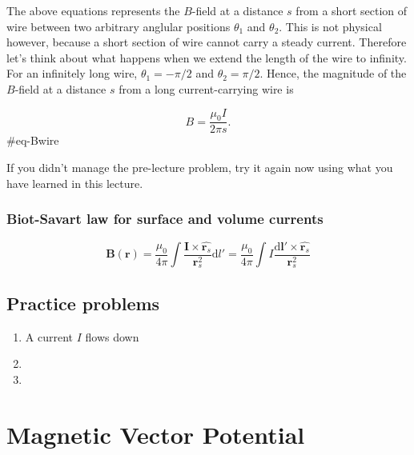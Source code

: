 \documentclass[
  letterpaper,
  DIV=11,
  numbers=noendperiod]{scrreprt}
\begin{document}
The above equations represents the \(B\)-field at a distance \(s\) from
a short section of wire between two arbitrary anglular positions
\(\theta_1\) and \(\theta_2\). This is not physical however, because a
short section of wire cannot carry a steady current. Therefore let's
think about what happens when we extend the length of the wire to
infinity. For an infinitely long wire, \(\theta_1 = -\pi/2\) and
\(\theta_2 = \pi/2\). Hence, the magnitude of the \(B\)-field at a
distance \(s\) from a long current-carrying wire is

\[ B = \frac{\mu_0 I}{2\pi s}. \]\#eq-Bwire

If you didn't manage the pre-lecture problem, try it again now using
what you have learned in this lecture.

\subsection{Biot-Savart law for surface and volume
currents}\label{biot-savart-law-for-surface-and-volume-currents}

\[\mathrm{\mathbf{B}}(\mathrm{\mathbf{r}}) = \frac{\mu_0}{4\pi} \int \frac{\mathrm{\mathbf{I}}\times \hat{\mathrm{\mathbf{r}}_s} }{\mathrm{\mathbf{r}}_s^2} \mathrm{d}l' =  \frac{\mu_0}{4\pi} \int I \frac{\mathrm{d} \mathrm{\mathbf{l}}' \times \hat{\mathrm{\mathbf{r}}_s} }{\mathrm{\mathbf{r}}_s^2} \]

\section{Practice problems}\label{practice-problems-4}

\begin{enumerate}
\def\labelenumi{\arabic{enumi})}
\item
  A current \(I\) flows down
\item
\item
\end{enumerate}


\chapter{Magnetic Vector Potential}\label{magnetic-vector-potential}

\newcommand{\l}{\mathrm{\mathbf{l}}}
\newcommand{\E}{\mathrm{\mathbf{E}}}
\newcommand{\F}{\mathrm{\mathbf{F}}}
\newcommand{\r}{\mathrm{\mathbf{r}}}
\newcommand{\B}{\mathrm{\mathbf{B}}}
\newcommand{\A}{\mathrm{\mathbf{A}}}
\newcommand{\x}{\mathrm{\mathbf{x}}}
\newcommand{\y}{\mathrm{\mathbf{y}}}
\newcommand{\z}{\mathrm{\mathbf{z}}}
\newcommand{\v}{\mathrm{\mathbf{v}}}
\newcommand{\p}{\mathrm{\mathbf{p}}}
\newcommand{\d}{\mathrm{\mathbf{d}}}
\end{document}
